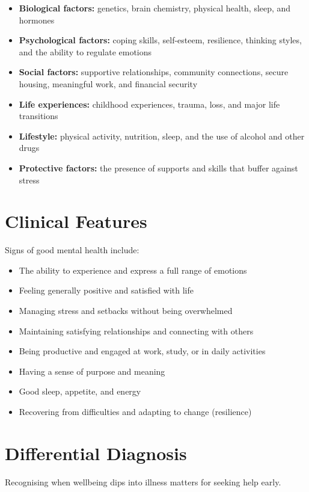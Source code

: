 \begin{itemize}
    \item \textbf{Biological factors:} genetics, brain chemistry, physical health, sleep, and hormones
    \item \textbf{Psychological factors:} coping skills, self-esteem, resilience, thinking styles, and the ability to regulate emotions
    \item \textbf{Social factors:} supportive relationships, community connections, secure housing, meaningful work, and financial security
    \item \textbf{Life experiences:} childhood experiences, trauma, loss, and major life transitions
    \item \textbf{Lifestyle:} physical activity, nutrition, sleep, and the use of alcohol and other drugs
    \item \textbf{Protective factors:} the presence of supports and skills that buffer against stress
\end{itemize}

\section*{Clinical Features}
Signs of good mental health include:

\begin{itemize}
    \item The ability to experience and express a full range of emotions
    \item Feeling generally positive and satisfied with life
    \item Managing stress and setbacks without being overwhelmed
    \item Maintaining satisfying relationships and connecting with others
    \item Being productive and engaged at work, study, or in daily activities
    \item Having a sense of purpose and meaning
    \item Good sleep, appetite, and energy
    \item Recovering from difficulties and adapting to change (resilience)
\end{itemize}

\section*{Differential Diagnosis}
Recognising when wellbeing dips into illness matters for seeking help early.

